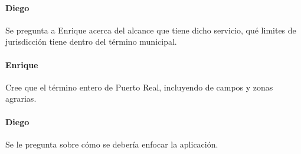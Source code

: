 \paragraph{Diego} Se pregunta a Enrique acerca del alcance que tiene dicho servicio, qué limites de jurisdicción tiene dentro del término municipal.
 
\paragraph{Enrique} Cree que el término entero de Puerto Real, incluyendo de campos y zonas agrarias.
 
\paragraph{Diego} Se le pregunta sobre cómo se debería enfocar la aplicación.
 
